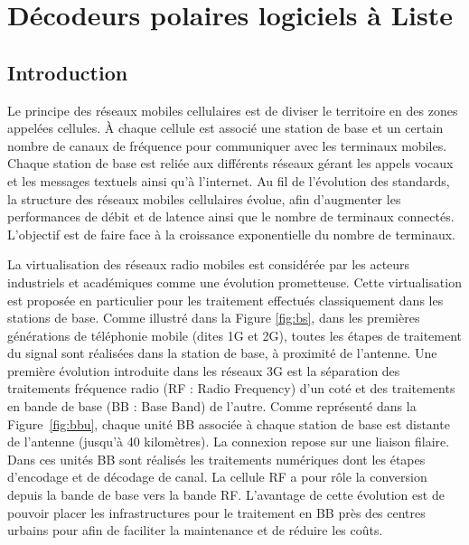 \chapter{Décodeurs polaires logiciels à Liste} %
\label{chap:soft_scl}

\vspace*{\fill}
\minitocTITI
\vspace*{\fill}
\newpage


\section{Introduction}

Le principe des réseaux mobiles cellulaires est de diviser le territoire en des zones appelées cellules. \`A chaque cellule est associé une station de base et un certain nombre de canaux de fréquence pour communiquer avec les terminaux mobiles. Chaque station de base est reliée aux différents réseaux gérant les appels vocaux et les messages textuels ainsi qu'à l'internet. Au fil de l'évolution des standards, la structure des réseaux mobiles cellulaires évolue, afin d'augmenter les performances de débit et de latence ainsi que le nombre de terminaux connectés. L'objectif est de faire face à la croissance exponentielle du nombre de terminaux.

La virtualisation des réseaux radio mobiles est considérée par les acteurs industriels \cite{ericsson_cloud_2015,huawei_5g:_2013} et académiques \cite{wubben_benefits_2014,rost_cloud_2014,checko_cloud_2015} comme une évolution prometteuse. Cette virtualisation est proposée en particulier pour les traitement effectués classiquement dans les stations de base. Comme illustré dans la Figure \ref{fig:bs}, dans les premières générations de téléphonie mobile (dites 1G et 2G), toutes les étapes de traitement du signal sont réalisées dans la station de base, à proximité de l'antenne. Une première évolution introduite dans les réseaux 3G est la séparation des traitements fréquence radio (RF : Radio Frequency) d'un coté et des traitements en bande de base (BB : Base Band) de l'autre. Comme représenté dans la Figure~\ref{fig:bbu}, chaque unité BB associée à chaque station de base est distante de l'antenne (jusqu'à 40 kilomètres). La connexion repose sur une liaison filaire. Dans ces unités BB sont réalisés les traitements numériques dont les étapes d'encodage et de décodage de canal. La cellule RF a pour rôle la conversion depuis la bande de base vers la bande RF. L'avantage de cette évolution est de pouvoir placer les infrastructures pour le traitement en BB près des centres urbains pour afin de faciliter la maintenance et de réduire les coûts.

